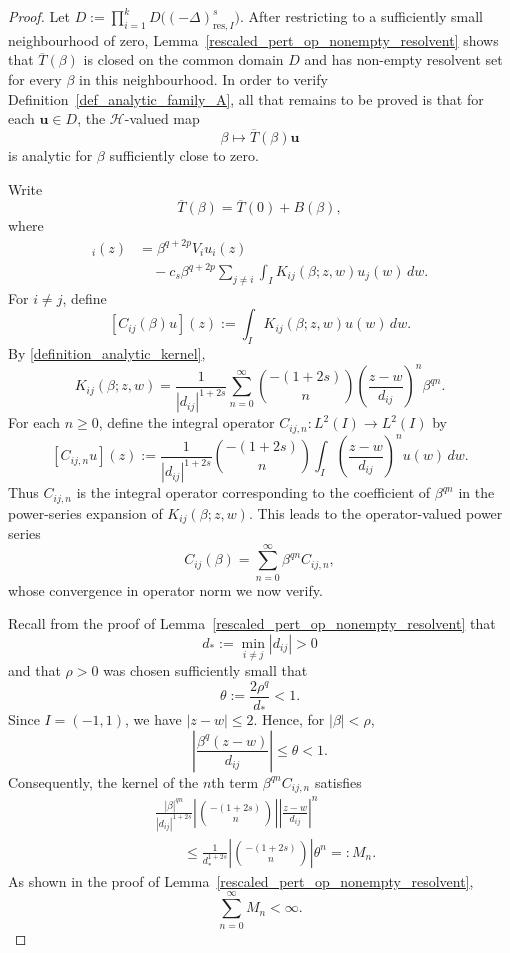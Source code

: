 \documentclass[preprint,12pt]{elsarticle}
\newcommand{\fvect}[1]{\mathbf{#1}}
\begin{document}
\begin{proof}
Let $D:=\prod_{i=1}^k D\bigl((-\Delta)^s_{\mathrm{res},I}\bigr)$. After restricting
to a sufficiently small neighbourhood of zero, Lemma~\ref{rescaled_pert_op_nonempty_resolvent} shows that
$\overline{T}(\beta)$ is closed on the common domain $D$ and has non-empty resolvent set for every $\beta$ in this neighbourhood. In order to verify
Definition~\ref{def_analytic_family_A}, all that remains to be proved is
that for each $\fvect{u}\in D$, the $\mathcal H$-valued map
\[
    \beta\longmapsto\overline{T}(\beta)\fvect{u}
\]
is analytic for $\beta$ sufficiently close to zero.

Write
\[
    \overline{T}(\beta)
    =
    \overline{T}(0)+B(\beta),
\]
where
\begin{align*}
    [B(\beta)\fvect{u}]_i(z)
    &=
    \beta^{q+2p}V_i u_i(z) \\
    &\quad
    -c_s\beta^{q+2p}
    \sum_{j\neq i}
    \int_I
    K_{ij}(\beta;z,w)u_j(w)\,dw .
\end{align*}
For $i\neq j$, define
\[
    [C_{ij}(\beta)u](z)
    :=
    \int_I K_{ij}(\beta;z,w)u(w)\,dw .
\]
By \eqref{definition_analytic_kernel},
\[
    K_{ij}(\beta;z,w)
    =
    \frac{1}{|d_{ij}|^{1+2s}}
    \sum_{n=0}^{\infty}
    \binom{-(1+2s)}{n}
    \left(
        \frac{z-w}{d_{ij}}
    \right)^n
    \beta^{qn}.
\]
For each $n\geq 0$, define the integral operator
$C_{ij,n}:L^2(I)\to L^2(I)$ by
\[
    [C_{ij,n}u](z)
    :=
    \frac{1}{|d_{ij}|^{1+2s}}
    \binom{-(1+2s)}{n}
    \int_I
    \left(
        \frac{z-w}{d_{ij}}
    \right)^n
    u(w)\,dw.
\]
Thus $C_{ij,n}$ is the integral operator corresponding to the
coefficient of $\beta^{qn}$ in the power-series expansion of
$K_{ij}(\beta;z,w)$. This leads to the operator-valued power series
\[
    C_{ij}(\beta)
    =
    \sum_{n=0}^{\infty}
    \beta^{qn}C_{ij,n},
\]
whose convergence in operator norm we now verify.

Recall from the proof of
Lemma~\ref{rescaled_pert_op_nonempty_resolvent} that
\[
    d_*:=\min_{i\neq j}|d_{ij}|>0
\]
and that $\rho>0$ was chosen sufficiently small that
\[
    \theta:=\frac{2\rho^q}{d_*}<1.
\]
Since $I=(-1,1)$, we have $|z-w|\leq 2$. Hence, for
$|\beta|<\rho$,
\[
    \left|
        \frac{\beta^q(z-w)}{d_{ij}}
    \right|
    \leq
    \theta<1.
\]
Consequently, the kernel of the $n$th term
$\beta^{qn}C_{ij,n}$ satisfies
\[
\begin{aligned}
    &\frac{|\beta|^{qn}}{|d_{ij}|^{1+2s}}
    \left|
        \binom{-(1+2s)}{n}
    \right|
    \left|
        \frac{z-w}{d_{ij}}
    \right|^n\\
    &\qquad\leq
    \frac{1}{d_*^{1+2s}}
    \left|
        \binom{-(1+2s)}{n}
    \right|
    \theta^n
    =:M_n .
\end{aligned}
\]
As shown in the proof of
Lemma~\ref{rescaled_pert_op_nonempty_resolvent},
\[
    \sum_{n=0}^{\infty}M_n<\infty.
\]


\end{proof}
\end{document}
